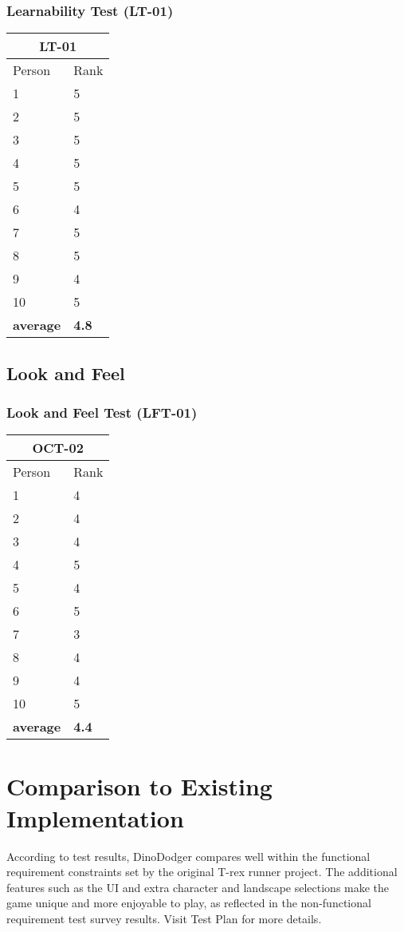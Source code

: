 \documentclass[12pt, titlepage]{article}
\begin{document}
\subsubsection{Learnability Test (LT-01)}
\begin{tabular}{ |p{5cm}|p{5cm}|  }
 \hline
 \multicolumn{2}{|c|}{LT-01} \\
 \hline
Person & Rank\\
 \hline
1 & 5\\
2 & 5\\
3 & 5\\
4 & 5\\
5 & 5\\
6 & 4\\
7 & 5\\
8 & 5\\
9 & 4\\
10 & 5\\
\textbf{average} & \textbf{4.8}\\
 \hline
\end{tabular}

\subsection{Look and Feel}
\subsubsection{Look and Feel Test (LFT-01)}
\begin{tabular}{ |p{5cm}|p{5cm}|  }
 \hline
 \multicolumn{2}{|c|}{OCT-02} \\
 \hline
Person & Rank\\
 \hline
1 & 4\\
2 & 4\\
3 & 4\\
4 & 5\\
5 & 4\\
6 & 5\\
7 & 3\\
8 & 4\\
9 & 4\\
10 & 5\\
\textbf{average} & \textbf{4.4}\\
 \hline
\end{tabular}	
\section{Comparison to Existing Implementation}	
According to test results, DinoDodger compares well within the functional requirement constraints set by the original T-rex runner project. The additional features such as the UI and extra character and landscape selections make the game unique and more enjoyable to play, as reflected in the non-functional requirement test survey results. Visit Test Plan for more details.
\end{document}
